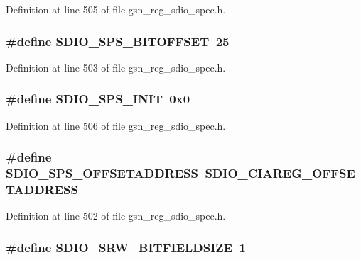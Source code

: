 Definition at line 505 of file gsn\_\-reg\_\-sdio\_\-spec.h.

\hypertarget{a00571_a8d8f70d9347482820572acc85ea04fb4}{
\subsubsection[{SDIO\_\-SPS\_\-BITOFFSET}]{\setlength{\rightskip}{0pt plus 5cm}\#define SDIO\_\-SPS\_\-BITOFFSET~25}}
\label{a00571_a8d8f70d9347482820572acc85ea04fb4}


Definition at line 503 of file gsn\_\-reg\_\-sdio\_\-spec.h.

\hypertarget{a00571_aa9392a3dbd6492336cb904fae5b068af}{
\subsubsection[{SDIO\_\-SPS\_\-INIT}]{\setlength{\rightskip}{0pt plus 5cm}\#define SDIO\_\-SPS\_\-INIT~0x0}}
\label{a00571_aa9392a3dbd6492336cb904fae5b068af}


Definition at line 506 of file gsn\_\-reg\_\-sdio\_\-spec.h.

\hypertarget{a00571_a3f97175ab11f94e4db8dc469caf2ca51}{
\subsubsection[{SDIO\_\-SPS\_\-OFFSETADDRESS}]{\setlength{\rightskip}{0pt plus 5cm}\#define SDIO\_\-SPS\_\-OFFSETADDRESS~SDIO\_\-CIAREG\_\-OFFSETADDRESS}}
\label{a00571_a3f97175ab11f94e4db8dc469caf2ca51}


Definition at line 502 of file gsn\_\-reg\_\-sdio\_\-spec.h.

\hypertarget{a00571_a19f0607259df8d03d0d9f1efcf63babb}{
\subsubsection[{SDIO\_\-SRW\_\-BITFIELDSIZE}]{\setlength{\rightskip}{0pt plus 5cm}\#define SDIO\_\-SRW\_\-BITFIELDSIZE~1}}
\label{a00571_a19f0607259df8d03d0d9f1efcf63babb}


